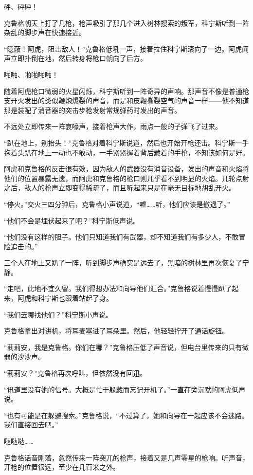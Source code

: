砰、砰砰！

克鲁格朝天上打了几枪，枪声吸引了那几个进入树林搜索的叛军，科宁斯听到一阵杂乱的脚步声在快速接近。

“隐蔽！阿虎，阻击敌人！”克鲁格低吼一声，接着拉住科宁斯滚向了一边。阿虎闻声立即扑倒在地，然后转身将枪口朝向了后方。

啪啪、啪啪啪啪！

随着阿虎枪口微弱的火星闪烁，科宁斯听到一阵奇异的声响。那声音不像是普通枪支开火发出的类似鞭炮爆裂的声音，而是和皮鞭撕裂空气的声音一样——他不知道那是装配了消音器的突击步枪发射常规弹药时发出的声音。

不远处立即传来一阵哀嚎声，接着枪声大作，雨点一般的子弹飞了过来。

“趴在地上，别抬头！”克鲁格对着科宁斯说道，然后也开始开枪还击。科宁斯一手抱着头趴在地上一动也不敢动，一手紧紧握着背后藏着的手枪，不知该如何是好。

阿虎和克鲁格的反击很有效，因为敌人的武器没有消音设备，发出的声音和火焰将他们的位置暴露无遗，而阿虎和克鲁格的枪口则几乎看不到明显的火焰。几轮点射之后，敌人的枪声立即变得稀疏了，而且听起来只是在毫无目标地胡乱开火。

“停火。”交火三四分钟后，克鲁格小声说道，“嘘……听，他们应该是撤退了。”

“他们不会是埋伏起来了吧？”科宁斯低声说。

“他们没有这样的胆子。他们只知道我们有武器，却不知道我们有多少人，不敢冒险追击的。”

三个人在地上又趴了一阵，听到脚步声确实是远去了，黑暗的树林里再次恢复了宁静。

“走吧，此地不宜久留。我们得想办法和向导他们汇合。”克鲁格说着慢慢趴了起来，阿虎和科宁斯也跟着站起了身。

“我们去哪找他们？”科宁斯小声说。

克鲁格拿出对讲机，将耳麦塞进了耳朵里。然后，他轻轻拧开了通话旋钮。

“莉莉安，我是克鲁格。你们在哪？”克鲁格压低了声音说，但电台里传来的只有微弱的沙沙声。

“莉莉安？”克鲁格再次呼叫，但依然没有回迅。

“讯道里没有她的信号。大概是忙于躲藏而忘记开机了。”一直在旁沉默的阿虎低声说。

“也有可能是在躲避搜索。”克鲁格说，“不过算了，她和向导在一起应该不会迷路。我们直接回去吧。”

哒哒哒……

克鲁格话音刚落，忽然传来一阵突兀的枪声，接着又是几声零星的枪响。听声音，开枪的位置很远，至少在几百米之外。

